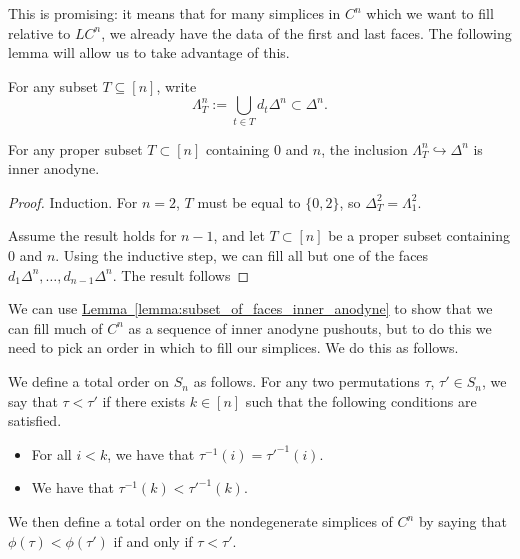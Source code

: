 \documentclass[main.tex]{subfiles}
\begin{document}
This is promising: it means that for many simplices in $C^{n}$ which we want to fill relative to $LC^{n}$, we already have the data of the first and last faces. The following lemma will allow us to take advantage of this.

\begin{notation}
  For any subset $T \subseteq [n]$, write
  \begin{equation*}
    \Lambda^{n}_{T} := \bigcup_{t \in T} d_{t} \Delta^{n} \subset \Delta^{n}.
  \end{equation*}
\end{notation}

\begin{lemma}
  \label{lemma:subset_of_faces_inner_anodyne}
  For any proper subset $T \subset [n]$ containing 0 and $n$, the inclusion $\Lambda^{n}_{T} \hookrightarrow \Delta^{n}$ is inner anodyne.
\end{lemma}
\begin{proof}
  Induction. For $n = 2$, $T$ must be equal to $\{0, 2\}$, so $\Delta^{2}_{T} = \Lambda^{2}_{1}$.

  Assume the result holds for $n-1$, and let $T \subset [n]$ be a proper subset containing $0$ and $n$. Using the inductive step, we can fill all but one of the faces $d_{1}\Delta^{n}, \ldots, d_{n-1}\Delta^{n}$. The result follows
\end{proof}

We can use \hyperref[lemma:subset_of_faces_inner_anodyne]{Lemma~\ref*{lemma:subset_of_faces_inner_anodyne}} to show that we can fill much of $C^{n}$ as a sequence of inner anodyne pushouts, but to do this we need to pick an order in which to fill our simplices. We do this as follows.

\begin{definition}
  \label{def:order_on_nondegenerate_simplices}
  We define a total order on $S_{n}$ as follows. For any two permutations $\tau$, $\tau' \in S_{n}$, we say that $\tau < \tau'$ if there exists $k \in [n]$ such that the following conditions are satisfied.
  \begin{itemize}
    \item For all $i < k$, we have that $\tau^{-1}(i) = \tau'^{-1}(i)$.

    \item We have that $\tau^{-1}(k) < \tau'^{-1}(k)$.
  \end{itemize}

  We then define a total order on the nondegenerate simplices of $C^{n}$ by saying that $\phi(\tau) < \phi(\tau')$ if and only if $\tau < \tau'$.
\end{definition}
\end{document}
